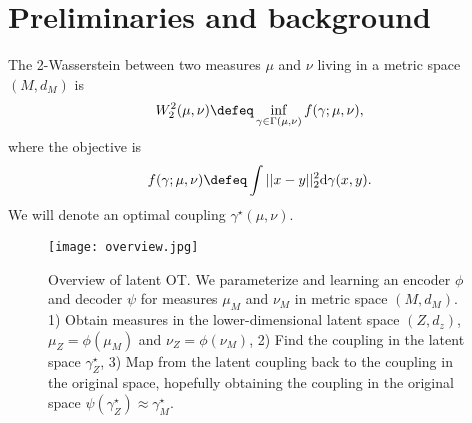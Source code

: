 
\section{Preliminaries and background}
The 2-Wasserstein \citep{villani2009optimal} between
two measures $\mu$ and $\nu$ living in a metric space $(M, d_M)$ is
\begin{equation}
  \label{eq:W2}
  W_2^2(\mu, \nu)\defeq \inf_{\gamma\in\Gamma(\mu,\nu)} f(\gamma; \mu, \nu),
\end{equation}
where the objective is
\begin{equation}
  \label{eq:W2_obj}
  f(\gamma; \mu, \nu)\defeq \int ||x-y||_2^2 {\rm d}\gamma(x,y).
\end{equation}
We will denote an optimal coupling $\gamma^\star(\mu,\nu)$.


\begin{figure}[t]
  \centering
\texttt{[image: overview.jpg]}
\caption{Overview of latent OT. We parameterize and
  learning an encoder $\phi$ and decoder $\psi$ for
  measures $\mu_M$ and $\nu_M$ in metric space $(M, d_M)$.
  1) Obtain measures in the lower-dimensional
  latent space $(Z, d_z)$, \ie
  $\mu_Z = \phi(\mu_M)$ and $\nu_Z = \phi(\nu_M)$,
  2) Find the coupling in the latent space $\gamma_Z^\star$,
  3) Map from the latent coupling back to the coupling
  in the original space, hopefully obtaining the
  coupling in the original space
  $\psi(\gamma_Z^\star) \approx \gamma_M^\star$.
}
\label{fig:overview}
\end{figure}

